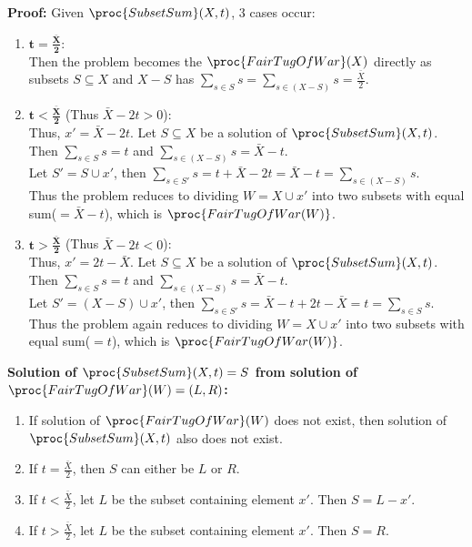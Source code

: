 \documentclass[11pt]{article}
\begin{document}
\noindent\textbf{Proof:} Given $\proc{SubsetSum}(X, t)$, $3$ cases occur:
\begin{enumerate}
    \item $\mathbf{t = \frac{\bar{X}}{2}}$:\\
    Then the problem becomes the $\proc{FairTugOfWar}(X)$ directly as subsets $S\subseteq X$ and $X-S$ has $\sum_{s\in S} s = \sum_{s\in (X-S)} s= \frac{\bar{X}}{2}$.
    \item $\mathbf{t < \frac{\bar{X}}{2}}$ (Thus $\bar{X}-2t>0$):\\
    Thus, $x' = \bar{X}-2t$. Let $S\subseteq X$ be a solution of $\proc{SubsetSum}(X, t)$.\\ 
    Then $\sum_{s\in S} s = t$ and $\sum_{s\in (X-S)} s= \bar{X}-t$.\\
    Let $S' = S \cup {x'}$, then $\sum_{s\in S'} s = t + \bar{X}-2t = \bar{X} - t = \sum_{s\in (X-S)} s$.\\
    Thus the problem reduces to dividing $W = X \cup {x'}$ into two subsets with equal sum($=\bar{X} - t$), which is $\proc{FairTugOfWar(W)}$.
    \item $\mathbf{t > \frac{\bar{X}}{2}}$ (Thus $\bar{X}-2t<0$):\\
    Thus, $x' = 2t-{\bar{X}}$. Let $S\subseteq X$ be a solution of $\proc{SubsetSum}(X, t)$.\\ 
    Then $\sum_{s\in S} s = t$ and $\sum_{s\in (X-S)} s= \bar{X}-t$.\\
    Let $S' = (X-S) \cup {x'}$, then $\sum_{s\in S'} s = \bar{X}-t + 2t-\bar{X} = t = \sum_{s\in S} s$.\\
    Thus the problem again reduces to dividing $W = X \cup {x'}$ into two subsets with equal sum($=t$), which is $\proc{FairTugOfWar(W)}$.
\end{enumerate}

\noindent\textbf{Solution of $\proc{SubsetSum}(X,t) = S$ from solution of $\proc{FairTugOfWar}(W) = (L,R)$:}
\begin{enumerate}
    \item If solution of $\proc{FairTugOfWar}(W)$ does not exist, then solution of $\proc{SubsetSum}(X,t)$ also does not exist.
    \item If $t = \frac{\bar{X}}{2}$, then $S$ can either be $L$ or $R$.
    \item If $t < \frac{\bar{X}}{2}$, let $L$ be the subset containing element $x'$. Then $S = L - {x'}$.
    \item If $t > \frac{\bar{X}}{2}$, let $L$ be the subset containing element $x'$. Then $S = R$.
\end{enumerate}
\end{document}
